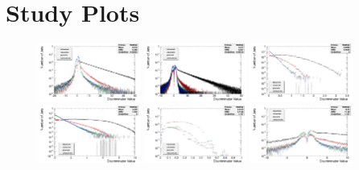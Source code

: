 \chapter{\btagging Study Plots}
\label{ac:b_tagging_plots}

\begin{figure}[hbtp]
   \centering
     \includegraphics[width=0.3\textwidth]{Chapters/04_Analysis/04a_BTags/Images/TrackCountingHighEfficiency_norm_discriminator_combined}\hfill
     \includegraphics[width=0.3\textwidth]{Chapters/04_Analysis/04a_BTags/Images/TrackCountingHighPurity_norm_discriminator_combined}\hfill
     \includegraphics[width=0.3\textwidth]{Chapters/04_Analysis/04a_BTags/Images/JetProbability_norm_discriminator_combined}\\
     \includegraphics[width=0.3\textwidth]{Chapters/04_Analysis/04a_BTags/Images/JetBProbability_norm_discriminator_combined}\hfill
     \includegraphics[width=0.3\textwidth]{Chapters/04_Analysis/04a_BTags/Images/SoftMuon_norm_discriminator_combined}\hfill
     \includegraphics[width=0.3\textwidth]{Chapters/04_Analysis/04a_BTags/Images/SoftMuonByIP3D_norm_discriminator_combined}\\

\end{figure}
